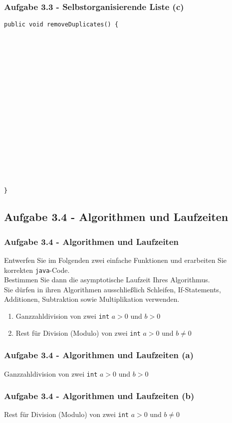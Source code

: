 \documentclass{beamer}
\begin{document}
\begin{frame}[t, fragile]
	\frametitle{Aufgabe 3.3 - Selbstorganisierende Liste (c)}
	\begin{verbatim}
public void removeDuplicates() {



















}
	\end{verbatim}
\end{frame}

\subsection{Aufgabe 3.4 - Algorithmen und Laufzeiten}
\begin{frame}
	\frametitle{Aufgabe 3.4 - Algorithmen und Laufzeiten}
	Entwerfen Sie im Folgenden zwei einfache Funktionen und erarbeiten Sie korrekten \texttt{java}-Code. \\
	Bestimmen Sie dann die asymptotische Laufzeit Ihres Algorithmus. \\
	Sie dürfen in ihren Algorithmen ausschließlich Schleifen, If-Statements, Additionen, Subtraktion sowie Multiplikation verwenden.

	\medskip
	\renewcommand{\theenumi}{\alph{enumi}}
	\begin{enumerate}
		\item Ganzzahldivision von zwei \texttt{int} $a > 0$ und $b > 0$
		\item Rest für Division (Modulo) von zwei \texttt{int} $a > 0$ und $b \neq 0$
	\end{enumerate}
\end{frame}

\begin{frame}[t]
	\frametitle{Aufgabe 3.4 - Algorithmen und Laufzeiten (a)}
	Ganzzahldivision von zwei \texttt{int} $a > 0$ und $b > 0$
\end{frame}

\begin{frame}[t]
	\frametitle{Aufgabe 3.4 - Algorithmen und Laufzeiten (b)}
	Rest für Division (Modulo) von zwei \texttt{int} $a > 0$ und $b \neq 0$
\end{frame}
\end{document}
